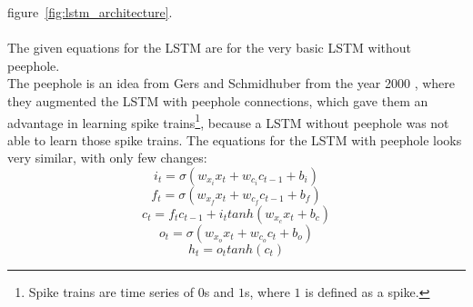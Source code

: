   figure~\ref{fig:lstm_architecture}.\\\\
  The given equations for the LSTM are for the very basic LSTM without peephole.\\
  The peephole is an idea from Gers and Schmidhuber from the year 2000 \cite{Gers2000}, where they augmented the LSTM
  with peephole connections, which gave them an advantage in learning spike trains\footnote[1]{Spike trains are time series of $0$s and $1$s, where $1$ is 
  defined as a spike.}, because a LSTM without peephole was not able to learn those spike trains.
  The equations for the LSTM with peephole looks very similar, with only few changes:
  \begin{equation}
   i_t = \sigma(w_{x_i}x_t + w_{c_i}c_{t-1} + b_i)
  \end{equation}
  \begin{equation}
   f_t = \sigma(w_{x_f}x_t + w_{c_f}c_{t-1} + b_f)
  \end{equation}
  \begin{equation}
   c_t = f_tc_{t-1} + i_ttanh(w_{x_c}x_t + b_c)
  \end{equation}
  \begin{equation}
   o_t = \sigma(w_{x_o}x_t + w_{c_o}c_t + b_o)
  \end{equation}
  \begin{equation}
   h_t = o_ttanh(c_t)
  \end{equation}
  
